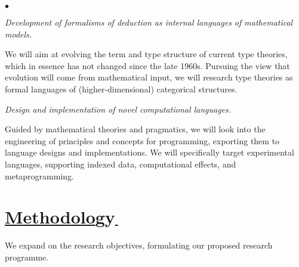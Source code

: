 \documentclass[11pt,twocolumn]{article}
\newenvironment{myitemize}
  {\begin{list}{$\bullet$}
  {\setlength{\topsep}{2pt}
   \setlength{\partopsep}{2pt}
   \setlength{\itemsep}{2.5pt}
   \setlength{\parsep}{2.5pt}
   \setlength{\leftmargin}{1em}
   \setlength{\labelwidth}{.5em}}}
  {\end{list}}
\begin{document}
\begin{myitemize}
\item[{\bfseries 3\enspace Calculi:}]\mbox{}\enspace\thinspace
%  
  \emph{Development of formalisms of deduction as internal languages of
    mathematical models.}
  
  We will aim at evolving the term and type structure of current type
  theories, which in essence has not changed since the late 1960s.  Pursuing
  the view that %
  evolution will come from mathematical input, we will
  research type theories as formal languages of (higher-dimensional)
  categorical structures.  

\item[{\bfseries 4\enspace Programming:}]\mbox{}\enspace\thinspace
%
  \emph{Design and implementation of novel computational languages.}

  \vspace*{.5mm}
  Guided by mathematical theories and pragmatics, we will look into the
  engineering of principles and concepts for programming, exporting them to
  language designs and implementations.  We will specifically target
  experimental languages, supporting indexed data, computational
  effects, and metaprogramming.  
\end{myitemize}

\section{\underline{Methodolo}gy\hspace{-1mm}\underline{\,}}
\label{MethodologySection}

We expand on the research objectives, formulating our proposed 
research programme. %
\end{document}
